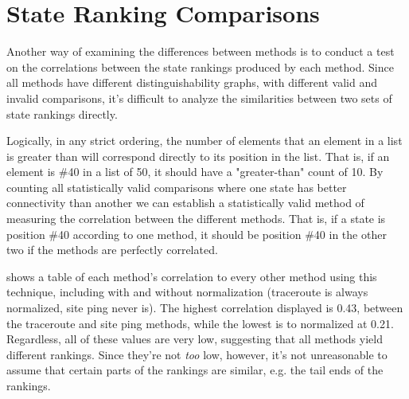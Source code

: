 \section{State Ranking Comparisons}\label{sec:comparative-correlations}

Another way of examining the differences between methods is to conduct a test on the correlations between the state rankings produced by each method. Since all methods have different distinguishability graphs, with different valid and invalid comparisons, it's difficult to analyze the similarities between two sets of state rankings directly.

Logically, in any strict ordering, the number of elements that an element in a list is greater than will correspond directly to its position in the list. That is, if an element is \#40 in a list of 50, it should have a "greater-than" count of 10. By counting all statistically valid comparisons where one state has better connectivity than another we can establish a statistically valid method of measuring the correlation between the different methods. That is, if a state is position \#40 according to one method, it should be position \#40 in the other two if the methods are perfectly correlated.



 shows a table of each method's correlation to every other method using this technique, including \dns with and without normalization (traceroute is always normalized, site ping never is). The highest correlation displayed is 0.43, between the traceroute and site ping methods, while the lowest is \dns to normalized \dns at 0.21. Regardless, all of these values are very low, suggesting that all methods yield different rankings. Since they're not \textit{too} low, however, it's not unreasonable to assume that certain parts of the rankings are similar, e.g. the tail ends of the rankings.
